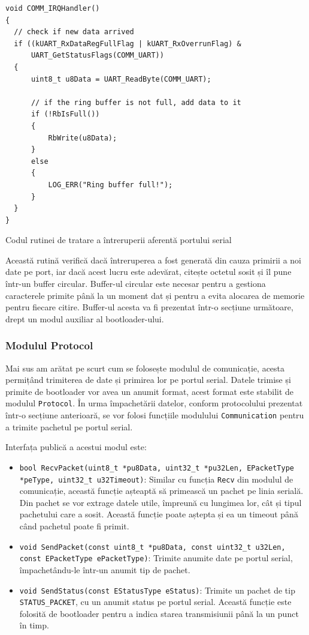 \documentclass[12pt,a4paper,titlepage]{report}
\begin{document}
\begin{listing}[h]
\begin{verbatim}
void COMM_IRQHandler()
{
  // check if new data arrived
  if ((kUART_RxDataRegFullFlag | kUART_RxOverrunFlag) &
      UART_GetStatusFlags(COMM_UART))
  {
      uint8_t u8Data = UART_ReadByte(COMM_UART);

      // if the ring buffer is not full, add data to it
      if (!RbIsFull())
      {
          RbWrite(u8Data);
      }
      else
      {
          LOG_ERR("Ring buffer full!");
      }
  }
}

\end{verbatim}

\caption{Codul rutinei de tratare a întreruperii aferentă portului serial}
\label{uartIRQ}
\end{listing}

Această rutină verifică dacă întreruperea a fost generată din cauza primirii a noi date pe port, iar dacă acest lucru este adevărat, citește octetul sosit și îl pune într-un buffer circular. Buffer-ul circular este necesar pentru a gestiona caracterele primite până la un moment dat și pentru a evita alocarea de memorie pentru fiecare citire. Buffer-ul acesta va fi prezentat într-o secțiune următoare, drept un modul auxiliar al bootloader-ului.

\subsubsection{Modulul Protocol}
Mai sus am arătat pe scurt cum se folosește modulul de comunicație, acesta permițând trimiterea de date și primirea lor pe portul serial. Datele trimise și primite de bootloader vor avea un anumit format, acest format este stabilit de modulul \texttt{Protocol}. În urma împachetării datelor, conform protocolului prezentat într-o secțiune anterioară, se vor folosi funcțiile modulului \texttt{Communication} pentru a trimite pachetul pe portul serial.

Interfața publică a acestui modul este:
\begin{itemize}
\item \texttt{bool RecvPacket(uint8\_t *pu8Data, uint32\_t *pu32Len, EPacketType *peType, uint32\_t u32Timeout)}: Similar cu funcția \texttt{Recv} din modulul de comunicație, această funcție așteaptă să primească un pachet pe linia serială. Din pachet se vor extrage datele utile, împreună cu lungimea lor, cât și tipul pachetului care a sosit. Această funcție poate aștepta și ea un timeout până când pachetul poate fi primit.
\item \texttt{void SendPacket(const uint8\_t *pu8Data, const uint32\_t u32Len, const EPacketType ePacketType)}: Trimite anumite date pe portul serial, împachetându-le într-un anumit tip de pachet.
\item \texttt{void SendStatus(const EStatusType eStatus)}: Trimite un pachet de tip \texttt{STATUS\_PACKET}, cu un anumit status pe portul serial. Această funcție este folosită de bootloader pentru a indica starea transmisiunii până la un punct în timp.
\end{itemize}
\end{document}
